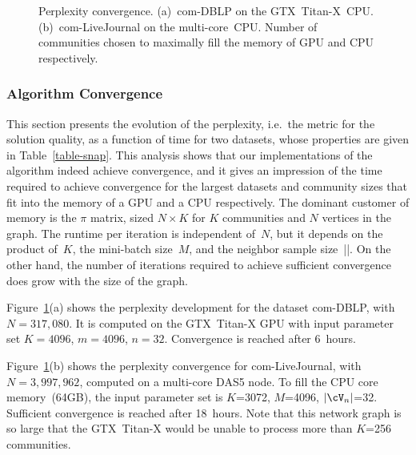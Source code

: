
\begin{comment}
\begin{figure}[t]	%
  \centering
  \epsfig{file=plots/ppx-gpu.eps, width=\columnwidth}
  \caption{Perplexity convergence of com-DBLP on the GTX~\mbox{Titan-X}~GPU. Number
  of communities chosen to maximally fill the GPU memory.}
  \label{fig-ppx-gpu}
\end{figure}

\begin{figure}[t]	%
  \centering
  \epsfig{file=plots/ppx-cpu.eps, width=\columnwidth}
  \caption{Perplexity convergence of com-LiveJournal on the multi-core~CPU.
  Number of communities chosen to maximally fill the CPU memory.}
  \label{fig-ppx-cpu}
\end{figure}
\end{comment}

\begin{figure}[t]	%
  \centering
  \caption{Perplexity convergence. (a)~com-DBLP on the GTX~\mbox{Titan-X}~CPU.
  (b)~com-LiveJournal on the multi-core~CPU. Number of communities chosen to
  maximally fill the memory of GPU and CPU respectively.}
  \label{fig-ppx-gpu-cpu}
\end{figure}

\subsubsection{Algorithm Convergence}

This section presents the evolution of the perplexity, i.e.\ the metric for
the solution quality, as a function of time for
two datasets, whose properties are given in Table~\ref{table-snap}. This
analysis shows that our implementations of the algorithm indeed achieve
convergence, and it gives an impression of the time required to achieve
convergence for the largest datasets and community sizes that fit into the memory
of a GPU and a CPU respectively. The dominant customer of memory is the
$\pi$ matrix, sized $N{\times}K$ for $K$ communities and $N$ vertices in the
graph. The runtime per iteration is independent of~$N$, but it depends on the
product of~$K$, the mini-batch size~$M$, and the neighbor sample size~|\Neighbors|. On
the other hand, the number of iterations required to achieve sufficient
convergence does grow with the size of the graph.

Figure~\ref{fig-ppx-gpu-cpu}(a) shows the perplexity development for the dataset
com-DBLP, with $N=317,080$. It is computed on the GTX~\mbox{Titan-X} GPU with input
parameter set $K=4096$, $m=4096$, $n=32$. Convergence is reached after 6~hours.

Figure~\ref{fig-ppx-gpu-cpu}(b) shows the perplexity convergence for
com-LiveJournal, with $N=3,997,962$, computed on a multi-core DAS5 node.
To fill the CPU core memory~(64GB), the input parameter set is $K$=3072,
$M$=4096, $|\Neighbors|$=32. Sufficient convergence is reached after 18~hours. Note
that this network graph is so large that the GTX~\mbox{Titan-X} would be unable to
process more than $K$=256 communities.

